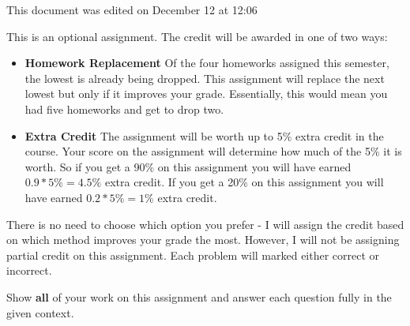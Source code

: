 \documentclass[11pt]{article}\usepackage[]{graphicx}\usepackage[]{color}
\begin{document}
\pagestyle{fancy} 

This document was edited on December 12 at 12:06

This is an optional assignment. The credit will be awarded in one of two ways:
\begin{itemize}
   \item \textbf{Homework Replacement} Of the four homeworks assigned this semester, the lowest is already being dropped. This assignment will replace the next lowest but only if it improves your grade. Essentially, this would mean you had five homeworks and get to drop two.
   \item \textbf{Extra Credit} The assignment will be worth up to 5\% extra credit in the course. Your score on the assignment will determine how much of the 5\% it is worth. So if you get a 90\% on this assignment you will have earned $0.9*5\% = 4.5\%$ extra credit. If you get a 20\% on this assignment you will have earned $0.2*5\% = 1\%$ extra credit.
\end{itemize}
There is no need to choose which option you prefer - I will assign the credit based on which method improves your grade the most. However, I will not be assigning partial credit on this assignment. Each problem will marked either correct or incorrect.

Show \textbf{all} of your work on this assignment and answer each question fully in the given context. 
\end{document}
